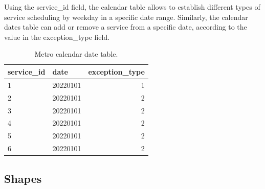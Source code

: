 \documentclass[12pt, a4paper]{report}
\begin{document}
\begin{table}[ht]
\centering
{}
\caption{Metro calendar table.}
\label{tab:Metro_Calendar}
\end{table}

Using the service\_id field, the calendar table allows to establish different types of service scheduling by weekday in a specific date range. Similarly, the calendar dates table can add or remove a service from a specific date, according to the value in the exception\_type field.

\begin{table}[ht]
\centering
\begin{tabular}{llr}
  \hline
 service\_id & date & exception\_type \\ 
  \hline
1 & 20220101 &   1 \\ 
2 & 20220101 &   2 \\ 
3 & 20220101 &   2 \\ 
4 & 20220101 &   2 \\ 
5 & 20220101 &   2 \\ 
6 & 20220101 &   2 \\ 
   \hline
\end{tabular}%
\caption{Metro calendar date table.}
\label{tab:Metro_Calendar_Dates}
\end{table}

\subsection{Shapes}
\end{document}
